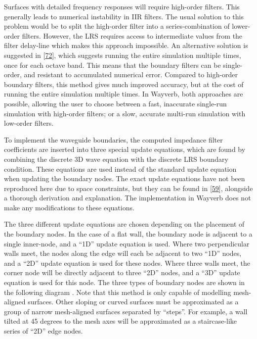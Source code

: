 \documentclass[]{scrreprt}
\begin{document}
Surfaces with detailed frequency responses will require high-order
filters. This generally leads to numerical instability in IIR filters.
The usual solution to this problem would be to split the high-order
filter into a series-combination of lower-order filters. However, the
LRS requires access to intermediate values from the filter delay-line
which makes this approach impossible. An alternative solution is
suggested in
{[}\protect\hyperlink{ref-oxnardux5ffrequency-dependentux5f2015}{72}{]},
which suggests running the entire simulation multiple times, once for
each octave band. This means that the boundary filters can be
single-order, and resistant to accumulated numerical error. Compared to
high-order boundary filters, this method gives much improved accuracy,
but at the cost of running the entire simulation multiple times. In
Wayverb, both approaches are possible, allowing the user to choose
between a fast, inaccurate single-run simulation with high-order
filters; or a slow, accurate multi-run simulation with low-order
filters.

To implement the waveguide boundaries, the computed impedance filter
coefficients are inserted into three special update equations, which are
found by combining the discrete 3D wave equation with the discrete LRS
boundary condition. These equations are used instead of the standard
update equation when updating the boundary nodes. The exact update
equations have not been reproduced here due to space constraints, but
they can be found in
{[}\protect\hyperlink{ref-kowalczykux5fmodelingux5f2008}{59}{]},
alongside a thorough derivation and explanation. The implementation in
Wayverb does not make any modifications to these equations.

The three different update equations are chosen depending on the
placement of the boundary nodes. In the case of a flat wall, the
boundary node is adjacent to a single inner-node, and a ``1D'' update
equation is used. Where two perpendicular walls meet, the nodes along
the edge will each be adjacent to two ``1D'' nodes, and a ``2D'' update
equation is used for these nodes. Where three walls meet, the corner
node will be directly adjacent to three ``2D'' nodes, and a ``3D''
update equation is used for this node. The three types of boundary nodes
are shown in the following diagram
\text{(\ref{fig:boundary_type_diagram})}. Note that this method is only
capable of modelling mesh-aligned surfaces. Other sloping or curved
surfaces must be approximated as a group of narrow mesh-aligned surfaces
separated by ``steps''. For example, a wall tilted at 45 degrees to the
mesh axes will be approximated as a staircase-like series of ``2D'' edge
nodes.
\end{document}
